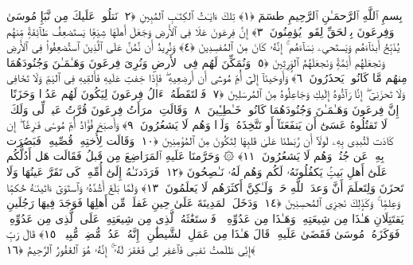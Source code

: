
  
    
  
    
    

\nopagebreak
  بِسمِ ٱللَّهِ ٱلرَّحمَـٰنِ ٱلرَّحِيمِ
  طسٓمٓ ﴿١﴾
 تِلكَ ءَايَـٰتُ ٱلكِتَـٰبِ ٱلمُبِينِ ﴿٢﴾
 نَتلُوا۟ عَلَيكَ مِن نَّبَإِ مُوسَىٰ وَفِرعَونَ بِٱلحَقِّ لِقَومٍۢ يُؤمِنُونَ ﴿٣﴾
 إِنَّ فِرعَونَ عَلَا فِى ٱلأَرضِ وَجَعَلَ أَهلَهَا شِيَعًۭا يَستَضعِفُ طَآئِفَةًۭ مِّنهُم يُذَبِّحُ أَبنَآءَهُم وَيَستَحىِۦ نِسَآءَهُم ۚ إِنَّهُۥ كَانَ مِنَ ٱلمُفسِدِينَ ﴿٤﴾
 وَنُرِيدُ أَن نَّمُنَّ عَلَى ٱلَّذِينَ ٱستُضعِفُوا۟ فِى ٱلأَرضِ وَنَجعَلَهُم أَئِمَّةًۭ وَنَجعَلَهُمُ ٱلوَٟرِثِينَ ﴿٥﴾
 وَنُمَكِّنَ لَهُم فِى ٱلأَرضِ وَنُرِىَ فِرعَونَ وَهَـٰمَـٰنَ وَجُنُودَهُمَا مِنهُم مَّا كَانُوا۟ يَحذَرُونَ ﴿٦﴾
 وَأَوحَينَآ إِلَىٰٓ أُمِّ مُوسَىٰٓ أَن أَرضِعِيهِ ۖ فَإِذَا خِفتِ عَلَيهِ فَأَلقِيهِ فِى ٱليَمِّ وَلَا تَخَافِى وَلَا تَحزَنِىٓ ۖ إِنَّا رَآدُّوهُ إِلَيكِ وَجَاعِلُوهُ مِنَ ٱلمُرسَلِينَ ﴿٧﴾
 فَٱلتَقَطَهُۥٓ ءَالُ فِرعَونَ لِيَكُونَ لَهُم عَدُوًّۭا وَحَزَنًا ۗ إِنَّ فِرعَونَ وَهَـٰمَـٰنَ وَجُنُودَهُمَا كَانُوا۟ خَـٰطِـِٔينَ ﴿٨﴾
 وَقَالَتِ ٱمرَأَتُ فِرعَونَ قُرَّتُ عَينٍۢ لِّى وَلَكَ ۖ لَا تَقتُلُوهُ عَسَىٰٓ أَن يَنفَعَنَآ أَو نَتَّخِذَهُۥ وَلَدًۭا وَهُم لَا يَشعُرُونَ ﴿٩﴾
 وَأَصبَحَ فُؤَادُ أُمِّ مُوسَىٰ فَـٰرِغًا ۖ إِن كَادَت لَتُبدِى بِهِۦ لَولَآ أَن رَّبَطنَا عَلَىٰ قَلبِهَا لِتَكُونَ مِنَ ٱلمُؤمِنِينَ ﴿١٠﴾
 وَقَالَت لِأُختِهِۦ قُصِّيهِ ۖ فَبَصُرَت بِهِۦ عَن جُنُبٍۢ وَهُم لَا يَشعُرُونَ ﴿١١﴾
 ۞ وَحَرَّمنَا عَلَيهِ ٱلمَرَاضِعَ مِن قَبلُ فَقَالَت هَل أَدُلُّكُم عَلَىٰٓ أَهلِ بَيتٍۢ يَكفُلُونَهُۥ لَكُم وَهُم لَهُۥ نَـٰصِحُونَ ﴿١٢﴾
 فَرَدَدنَـٰهُ إِلَىٰٓ أُمِّهِۦ كَى تَقَرَّ عَينُهَا وَلَا تَحزَنَ وَلِتَعلَمَ أَنَّ وَعدَ ٱللَّهِ حَقٌّۭ وَلَـٰكِنَّ أَكثَرَهُم لَا يَعلَمُونَ ﴿١٣﴾
 وَلَمَّا بَلَغَ أَشُدَّهُۥ وَٱستَوَىٰٓ ءَاتَينَـٰهُ حُكمًۭا وَعِلمًۭا ۚ وَكَذَٟلِكَ نَجزِى ٱلمُحسِنِينَ ﴿١٤﴾
 وَدَخَلَ ٱلمَدِينَةَ عَلَىٰ حِينِ غَفلَةٍۢ مِّن أَهلِهَا فَوَجَدَ فِيهَا رَجُلَينِ يَقتَتِلَانِ هَـٰذَا مِن شِيعَتِهِۦ وَهَـٰذَا مِن عَدُوِّهِۦ ۖ فَٱستَغَٰثَهُ ٱلَّذِى مِن شِيعَتِهِۦ عَلَى ٱلَّذِى مِن عَدُوِّهِۦ فَوَكَزَهُۥ مُوسَىٰ فَقَضَىٰ عَلَيهِ ۖ قَالَ هَـٰذَا مِن عَمَلِ ٱلشَّيطَٰنِ ۖ إِنَّهُۥ عَدُوٌّۭ مُّضِلٌّۭ مُّبِينٌۭ ﴿١٥﴾
 قَالَ رَبِّ إِنِّى ظَلَمتُ نَفسِى فَٱغفِر لِى فَغَفَرَ لَهُۥٓ ۚ إِنَّهُۥ هُوَ ٱلغَفُورُ ٱلرَّحِيمُ ﴿١٦﴾

